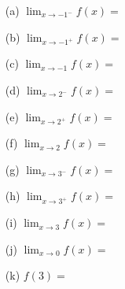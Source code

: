 \documentclass[10pt]{article}
\begin{document}
{{

\begin{enumerate}
    \item[(a)] $\displaystyle\lim_{x\to-1^-} f(x)=$
    \item[(b)] $\displaystyle\lim_{x\to-1^+} f(x)=$
    \item[(c)] $\displaystyle\lim_{x\to-1} f(x)=$
    \item[(d)] $\displaystyle\lim_{x\to2^-} f(x)=$
    \item[(e)] $\displaystyle\lim_{x\to2^+} f(x)=$
    \item[(f)] $\displaystyle\lim_{x\to2} f(x)=$
\end{enumerate}

\begin{enumerate}
    \item[(g)] $\displaystyle\lim_{x\to3^-} f(x)=$
    \item[(h)] $\displaystyle\lim_{x\to3^+} f(x)=$
    \item[(i)] $\displaystyle\lim_{x\to3} f(x)=$
    \item[(j)] $\displaystyle\lim_{x\to0} f(x)=$
    \item[(k)] $f(3)=$
\end{enumerate}


\newpage

}}
\end{document}
